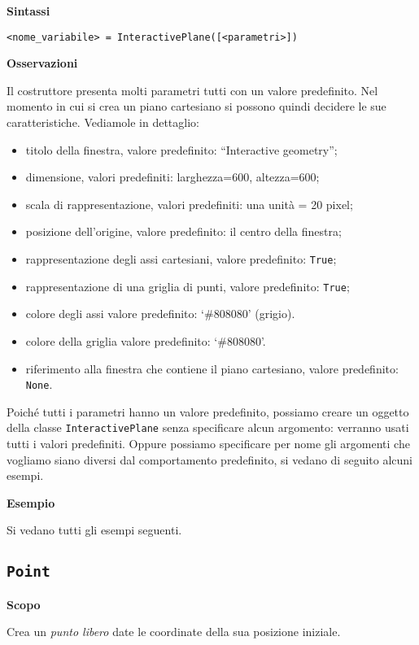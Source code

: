 \textbf{Sintassi}

\begin{lstlisting}
<nome_variabile> = InteractivePlane([<parametri>])
\end{lstlisting}

\textbf{Osservazioni}

Il costruttore presenta molti parametri tutti con un valore predefinito.
Nel momento in cui si crea un piano cartesiano si possono quindi decidere
le sue caratteristiche. Vediamole in dettaglio:

\begin{itemize} [noitemsep]
\item titolo della finestra, valore predefinito: ``Interactive geometry'';
\item dimensione, valori predefiniti: larghezza=600, altezza=600;
\item scala di rappresentazione, valori predefiniti: una unità = 20 pixel;
\item posizione dell'origine, valore predefinito: il centro della finestra;
\item rappresentazione degli assi cartesiani, valore predefinito: 
 \texttt{True};
\item rappresentazione di una griglia di punti, valore predefinito: 
 \texttt{True};
\item colore degli assi valore predefinito: `\#808080' (grigio).
\item colore della griglia valore predefinito: `\#808080'.
\item riferimento alla finestra che contiene il piano cartesiano,
valore predefinito: \texttt{None}.
\end{itemize}

Poiché tutti i parametri hanno un valore predefinito, possiamo creare un
oggetto della classe \texttt{InteractivePlane} senza specificare alcun 
argomento: verranno usati tutti i valori predefiniti. 
Oppure possiamo specificare per
nome gli argomenti che vogliamo siano diversi dal comportamento predefinito,
si vedano di seguito alcuni esempi.

\textbf{Esempio}

Si vedano tutti gli esempi seguenti.


\subsection{\texttt{Point}} 
\label{sub:geoint_point}
\textbf{Scopo}

Crea un \emph{punto libero} date le coordinate della sua posizione iniziale.

